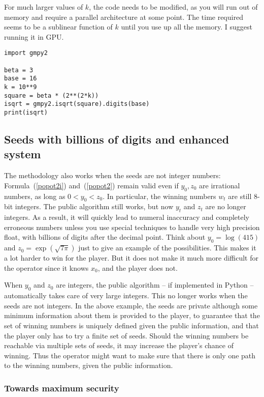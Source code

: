\documentclass[oneside,10pt]{book}
\begin{document}
For much larger values of $k$, the code needs to be modified, as you will run out of memory and require a parallel architecture at some point. The time required seems to be a sublinear function of $k$ until you use  up all the memory. I suggest running it in GPU. \vspace{1ex}

\begin{lstlisting}
import gmpy2

beta = 3
base = 16
k = 10**9
square = beta * (2**(2*k))
isqrt = gmpy2.isqrt(square).digits(base)
print(isqrt)
\end{lstlisting}


\subsection{Seeds with billions of digits and enhanced system}\label{sredsa}

The methodology also works when the seeds are not integer numbers: Formula~(\ref{popot2i}) and~(\ref{popot2}) remain valid even
 if $y_0, z_0$ are irrational numbers, as long as $0< y_0< z_0$. In particular, the winning numbers $w_t$ are still 8-bit integers. The public algorithm still works, but now $y_t$ and $z_t$ are no longer integers. As a result, it will quickly lead to numeral inaccuracy and completely erroneous numbers unless you use special techniques to handle very high precision float, with billions of digits after the decimal point. Think about $y_0 = \log(415)$ and
 $z_0 = \exp(\sqrt{7\pi})$ just to give an example of the possibilities. This makes it a lot harder to win for the player. But 
it does not  make it much more difficult for the operator since it knows $x_0$, and the player does not.

When $y_0$ and $z_0$ are integers, the public algorithm -- if implemented in Python -- automatically takes care of very large integers. This no longer works when the seeds are not integers. In the above example, the seeds are private although some minimum information about them is provided to the player, to guarantee that the set of winning numbers is uniquely defined given the public information, and that the player only has to try a finite set of seeds.  Should the winning numbers be reachable via multiple sets of seeds, it may increase the player's chance of winning. Thus the operator might want to make sure that there is only one path to the winning numbers, given the public information.

\subsubsection{Towards maximum security}\label{tms20}
\end{document}
